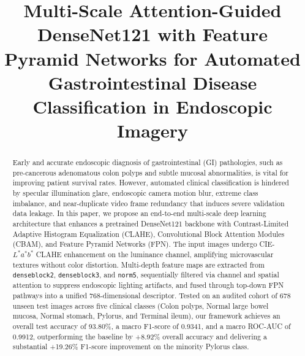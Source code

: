 \documentclass[conference]{IEEEtran}
\begin{document}
\title{Multi-Scale Attention-Guided DenseNet121 with Feature Pyramid Networks for Automated Gastrointestinal Disease Classification in Endoscopic Imagery}

\author{
\and
{}
}

\maketitle

\begin{abstract}
Early and accurate endoscopic diagnosis of gastrointestinal (GI) pathologies, such as pre-cancerous adenomatous colon polyps and subtle mucosal abnormalities, is vital for improving patient survival rates. However, automated clinical classification is hindered by specular illumination glare, endoscopic camera motion blur, extreme class imbalance, and near-duplicate video frame redundancy that induces severe validation data leakage. In this paper, we propose an end-to-end multi-scale deep learning architecture that enhances a pretrained DenseNet121 backbone with Contrast-Limited Adaptive Histogram Equalization (CLAHE), Convolutional Block Attention Modules (CBAM), and Feature Pyramid Networks (FPN). The input images undergo CIE-$L^*a^*b^*$ CLAHE enhancement on the luminance channel, amplifying microvascular textures without color distortion. Multi-depth feature maps are extracted from \texttt{denseblock2}, \texttt{denseblock3}, and \texttt{norm5}, sequentially filtered via channel and spatial attention to suppress endoscopic lighting artifacts, and fused through top-down FPN pathways into a unified 768-dimensional descriptor. Tested on an audited cohort of 678 unseen test images across five clinical classes (Colon polyps, Normal large bowel mucosa, Normal stomach, Pylorus, and Terminal ileum), our framework achieves an overall test accuracy of 93.80\%, a macro F1-score of 0.9341, and a macro ROC-AUC of 0.9912, outperforming the baseline by +8.92\% overall accuracy and delivering a substantial +19.26\% F1-score improvement on the minority Pylorus class.
\end{abstract}
\end{document}
